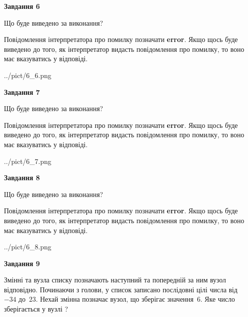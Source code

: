 \documentclass[12pt, ukrainian]{article}
\begin{document}
{\begin {large}
{\begin {center}\textbf{Завдання 6}\end {center}}\par
Що буде виведено за виконання?

Повідомлення інтерпретатора про помилку позначати \textbf{error}.
Якщо щось буде виведено до того, як інтерпретатор видасть повідомлення про помилку, 
то воно має вказуватись у відповіді. \par


\begin{center}
	{../pict/6_6.png}
\end{center}
\newpage

{\begin {center}\textbf{Завдання 7}\end {center}}\par
Що буде виведено за виконання?

Повідомлення інтерпретатора про помилку позначати \textbf{error}.
Якщо щось буде виведено до того, як інтерпретатор видасть повідомлення про помилку, 
то воно має вказуватись у відповіді. \par


\begin{center}
	{../pict/6_7.png}
\end{center}
\newpage

{\begin {center}\textbf{Завдання 8}\end {center}}\par
Що буде виведено за виконання?

Повідомлення інтерпретатора про помилку позначати \textbf{error}.
Якщо щось буде виведено до того, як інтерпретатор видасть повідомлення про помилку, 
то воно має вказуватись у відповіді. \par


\begin{center}
	{../pict/6_8.png}
\end{center}
\newpage

{\begin {center}\textbf{Завдання 9}\end {center}}\par
Змінні  та  вузла списку позначають наступний та попередній за ним вузол відповідно. Починаючи з голови, у список записано послідовні цілі числа від~$-34$ до~$23$. Нехай змінна  позначає вузол, що зберігає значення~$6$.
Яке число зберігається у вузлі  ?\par
\newpage


\end{large}}
\end{document}
